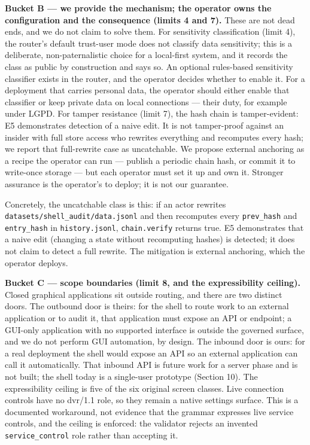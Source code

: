 \documentclass[11pt,a4paper]{article}
\begin{document}
\textbf{Bucket B --- we provide the mechanism; the operator owns the configuration and the consequence (limits 4 and 7).} These are not dead ends, and we do not claim to solve them. For sensitivity classification (limit 4), the router's default trust-user mode does not classify data sensitivity; this is a deliberate, non-paternalistic choice for a local-first system, and it records the class as public by construction and says so. An optional rules-based sensitivity classifier exists in the router, and the operator decides whether to enable it. For a deployment that carries personal data, the operator should either enable that classifier or keep private data on local connections --- their duty, for example under LGPD. For tamper resistance (limit 7), the hash chain is tamper-evident: E5 demonstrates detection of a naive edit. It is not tamper-proof against an insider with full store access who rewrites everything and recomputes every hash; we report that full-rewrite case as uncatchable. We propose external anchoring as a recipe the operator can run --- publish a periodic chain hash, or commit it to write-once storage --- but each operator must set it up and own it. Stronger assurance is the operator's to deploy; it is not our guarantee.

Concretely, the uncatchable class is this: if an actor rewrites \texttt{datasets/shell\_audit/data.jsonl} and then recomputes every \texttt{prev\_hash} and \texttt{entry\_hash} in \texttt{history.jsonl}, \texttt{chain.verify} returns true. E5 demonstrates that a naive edit (changing a state without recomputing hashes) is detected; it does not claim to detect a full rewrite. The mitigation is external anchoring, which the operator deploys.

\textbf{Bucket C --- scope boundaries (limit 8, and the expressibility ceiling).} Closed graphical applications sit outside routing, and there are two distinct doors. The outbound door is theirs: for the shell to route work to an external application or to audit it, that application must expose an API or endpoint; a GUI-only application with no supported interface is outside the governed surface, and we do not perform GUI automation, by design. The inbound door is ours: for a real deployment the shell would expose an API so an external application can call it automatically. That inbound API is future work for a server phase and is not built; the shell today is a single-user prototype (Section 10). The expressibility ceiling is five of the six original screen classes. Live connection controls have no dvr/1.1 role, so they remain a native settings surface. This is a documented workaround, not evidence that the grammar expresses live service controls, and the ceiling is enforced: the validator rejects an invented \texttt{service\_control} role rather than accepting it.
\end{document}
